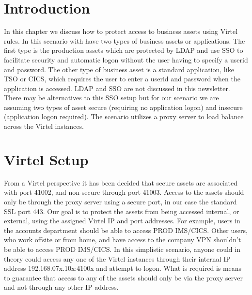 \documentclass[letterpaper,10pt,english]{sphinxmanual}
\begin{document}
\section{Introduction}
\label{\detokenize{connectivity_guide:id76}}
In this chapter we discuss how to protect access to business assets using Virtel rules. In this scenario with have two types of business assets or applications. The first type is the production assets which are protected by LDAP and use SSO to facilitate security and automatic logon without the user having to specify a userid and password. The other type of business asset is a standard application, like TSO or CICS, which requires the user to enter a userid and password when the application is accessed. LDAP and SSO are not discussed in this newsletter. There may be alternatives to this SSO setup but for our scenario we are assuming two types of asset \textendash{} secure (requiring no application logon) and insecure (application logon required). The scenario utilizes a proxy server to load balance across the Virtel instances.


\newpage

\ignorespaces 

\section{Virtel Setup}
\label{\detokenize{connectivity_guide:virtel-setup}}\label{\detokenize{connectivity_guide:index-188}}
From a Virtel perspective it has been decided that secure assets are associated with port 41002, and non-secure through port 41003. Access to the assets should only be through the proxy server using a secure port, in our case the standard SSL port 443. Our goal is to protect the assets from being accessed internal, or external, using the assigned Virtel IP
and port addresses. For example, users in the accounts department should be able to access PROD IMS/CICS. Other users, who work offsite or from home, and have access to the company VPN shouldn’t be able to access PROD IMS/CICS. In this simplistic scenario, anyone could in theory could access any one of the Virtel instances through their internal IP address \textendash{} 192.168.07x.10x:4100x and attempt to logon. What is required is means to guarantee that access to any of the assets should only be via the proxy server and not through any other IP address.
\end{document}
